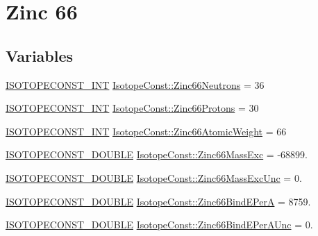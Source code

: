 \hypertarget{group___isotope_const-_zinc-_zn66}{}\section{Zinc 66}
\label{group___isotope_const-_zinc-_zn66}
\subsection*{Variables}
\begin{DoxyCompactItemize}
\item 
\mbox{\hyperlink{group___isotope_const-_macros_ga5f18360b3e99483a35c32d789e62621c}{I\+S\+O\+T\+O\+P\+E\+C\+O\+N\+S\+T\+\_\+\+I\+NT}} \mbox{\hyperlink{group___isotope_const-_zinc-_zn66_gaa6aefe62d2d0c8e071a55b1f5e1b4e5c}{Isotope\+Const\+::\+Zinc66\+Neutrons}} = 36
\item 
\mbox{\hyperlink{group___isotope_const-_macros_ga5f18360b3e99483a35c32d789e62621c}{I\+S\+O\+T\+O\+P\+E\+C\+O\+N\+S\+T\+\_\+\+I\+NT}} \mbox{\hyperlink{group___isotope_const-_zinc-_zn66_ga73051c31bbea4615c2c33702f622131c}{Isotope\+Const\+::\+Zinc66\+Protons}} = 30
\item 
\mbox{\hyperlink{group___isotope_const-_macros_ga5f18360b3e99483a35c32d789e62621c}{I\+S\+O\+T\+O\+P\+E\+C\+O\+N\+S\+T\+\_\+\+I\+NT}} \mbox{\hyperlink{group___isotope_const-_zinc-_zn66_gad9fa25037eee7736786deeeb626b3338}{Isotope\+Const\+::\+Zinc66\+Atomic\+Weight}} = 66
\item 
\mbox{\hyperlink{group___isotope_const-_macros_ga8f45a7272ce02c0b4c65c44636ed719a}{I\+S\+O\+T\+O\+P\+E\+C\+O\+N\+S\+T\+\_\+\+D\+O\+U\+B\+LE}} \mbox{\hyperlink{group___isotope_const-_zinc-_zn66_ga5f4f9ad546c80e31d82cae18cbf5cc14}{Isotope\+Const\+::\+Zinc66\+Mass\+Exc}} = -\/68899.
\item 
\mbox{\hyperlink{group___isotope_const-_macros_ga8f45a7272ce02c0b4c65c44636ed719a}{I\+S\+O\+T\+O\+P\+E\+C\+O\+N\+S\+T\+\_\+\+D\+O\+U\+B\+LE}} \mbox{\hyperlink{group___isotope_const-_zinc-_zn66_ga65e3a874cd96d3bf93f252a71b66216a}{Isotope\+Const\+::\+Zinc66\+Mass\+Exc\+Unc}} = 0.
\item 
\mbox{\hyperlink{group___isotope_const-_macros_ga8f45a7272ce02c0b4c65c44636ed719a}{I\+S\+O\+T\+O\+P\+E\+C\+O\+N\+S\+T\+\_\+\+D\+O\+U\+B\+LE}} \mbox{\hyperlink{group___isotope_const-_zinc-_zn66_ga08683101f85ea8e5466c3aa4b4442988}{Isotope\+Const\+::\+Zinc66\+Bind\+E\+PerA}} = 8759.
\item 
\mbox{\hyperlink{group___isotope_const-_macros_ga8f45a7272ce02c0b4c65c44636ed719a}{I\+S\+O\+T\+O\+P\+E\+C\+O\+N\+S\+T\+\_\+\+D\+O\+U\+B\+LE}} \mbox{\hyperlink{group___isotope_const-_zinc-_zn66_ga476621d9c21a4eb05eb8c0cbec338da9}{Isotope\+Const\+::\+Zinc66\+Bind\+E\+Per\+A\+Unc}} = 0.

\end{DoxyCompactItemize}
